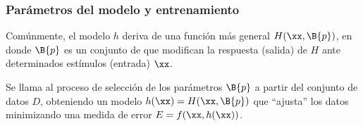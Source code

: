 %
\subsubsection{Parámetros del modelo y entrenamiento}
%
Comúnmente, el modelo $h$ deriva de una función más general $H(\xx,\B{p})$, en donde
$\B{p}$ es un conjunto de  que modifican la respuesta (salida)
de $H$ ante determinados estímulos (entrada) $\xx$.

Se llama  al proceso de selección de los parámetros $\B{p}$
a partir del conjunto de datos $D$, obteniendo un modelo $h(\xx)=H(\xx,\B{p})$
que ``ajusta'' los datos minimizando una medida de error $E=f(\xx,h(\xx))$.
